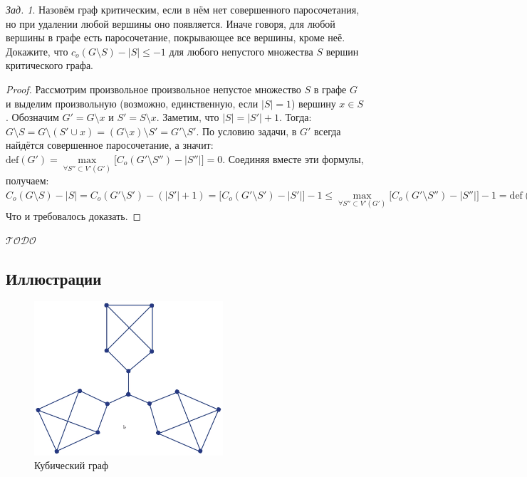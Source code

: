 \documentclass[a4paper,12pt]{article}
\numberwithin{figure}{section}
\theoremstyle{remark}
\newtheorem{problem}{Зад.}[section]
\def\iiTODO{\guillemotleft$\mathcal{TODO}$\guillemotright\textellipsis}
\begin{document}
\begin{problem}
  Назовём граф критическим, если в нём нет совершенного паросочетания, но при удалении любой вершины оно появляется. Иначе говоря, для любой вершины в графе есть паросочетание,	покрывающее все вершины, кроме неё. Докажите, что $c_o(G \setminus S) - |S| \leqslant -1$ для любого непустого множества $S$ вершин критического графа.
\end{problem}
\begin{proof}
  Рассмотрим произвольное произвольное непустое множество $S$ в графе $G$
  и выделим произвольную (возможно, единственную, если $|S|=1$) вершину $x \in S$.
  Обозначим $G' = G \setminus x$ и $S' = S \setminus x$.
  Заметим, что $ |S| = |S'| + 1 $.
  Тогда:
  $ G \setminus S = G \setminus (S' \cup x) = (G \setminus x) \setminus S' = G' \setminus S' $.
  По условию задачи, в $G'$ всегда найдётся совершенное паросочетание, а значит:
  $ \mathrm{def}(G') = \max \limits_{\forall S'' \subset V'(G')} \big[ C_o(G' \setminus S'') - |S''| \big] = 0 $.
  Соединяя вместе эти формулы, получаем:
  $C_o(G \setminus S) - |S| = C_o(G' \setminus S') - (|S'| + 1) = \big[ C_o(G' \setminus S') - |S'| \big] - 1 \leqslant
   \max \limits_{\forall S'' \subset V'(G')} \big[ C_o(G' \setminus S'') - |S''| \big] - 1
   = \mathrm{def}(G') - 1 = 0 - 1 = -1 $
  Что и требовалось доказать. 
\end{proof}

\iiTODO


\subsection{Иллюстрации}

\begin{figure}[H]
	\centering
	\includegraphics[width=7cm]{cubic-graph-example1.png}
	\caption{Кубический граф}
\end{figure}
\end{document}
